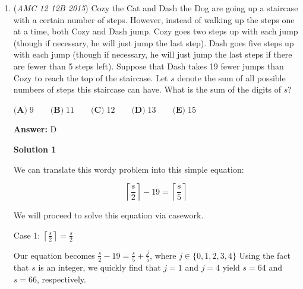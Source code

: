 \begin{enumerate}
 Repeating the argument above, we see that $f(5,n) = f(4, f(5,n-1))$ can only take values in $\{1,3\}$. However, $f(5,n-1)\neq 0$ for any $n$ implies that 
 \[f(5,n)\neq f(4,0)=3\] for any $n$. Thus $f(5,n)=1$ for all $n$. We can easily verify this: $f(5,0)=f(4,1)=1$, then 
 \[f(5,1)=f(4,f(5,0))=f(4,1)=1\implies f(5,2)=f(4,f(5,1))=f(4,1)=1\], and so on.

 Then $f(6,0)=f(5,1)=1$. Moreover, 
 \[f(6,n) = f(5,f(6,n-1)) = 1\] for all $n$. Continuing in this manner we see that $f(m,n)=1$ for all $m\ge 5$. 

 In particular, $f(2015,2) = \boxed{\textbf{(B)} \; 1}$.

 -Shihan

 -Ethanzhang1001 latex edits

 


	\item (\textit{AMC 12 12B 2015}) Cozy the Cat and Dash the Dog are going up a staircase with a certain number of steps. However, instead of walking up the steps one at a time, both Cozy and Dash jump. Cozy goes two steps up with each jump (though if necessary, he will just jump the last step). Dash goes five steps up with each jump (though if necessary, he will just jump the last steps if there are fewer than 5 steps left). Suppose that Dash takes 19 fewer jumps than Cozy to reach the top of the staircase. Let $s$ denote the sum of all possible numbers of steps this staircase can have. What is the sum of the digits of $s$?


 $\textbf{(A)}\; 9 \qquad\textbf{(B)}\; 11 \qquad\textbf{(C)}\; 12 \qquad\textbf{(D)}\; 13 \qquad\textbf{(E)}\; 15$

 \textbf{Answer: }D



\textbf{Solution 1}

We can translate this wordy problem into this simple equation:

 
 \[\left\lceil \frac{s}{2} \right\rceil - 19 = \left\lceil \frac{s}{5} \right\rceil\]

 We will proceed to solve this equation via casework.

 Case 1: $\left\lceil \frac{s}{2} \right\rceil = \frac{s}{2}$

 Our equation becomes $\frac{s}{2} - 19 = \frac{s}{5} + \frac{j}{5}$, where $j \in \{0,1,2,3,4\}$ Using the fact that $s$ is an integer, we quickly find that $j=1$ and $j=4$ yield $s=64$ and $s=66$, respectively.

 



\end{enumerate}
